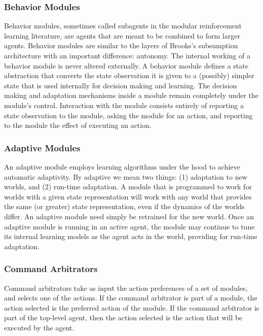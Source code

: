 \subsubsection{Behavior Modules}

Behavior modules, sometimes called subagents in the modular reinforcement learning literature, are agents that are meant to be combined to form larger agents.  Behavior modules are similar to the layers of Brooks's subsumption architecture with an important difference: autonomy.  The internal working of a behavior module is never altered externally.  A behavior module defines a state abstraction that converts the state observation it is given to a (possibly) simpler state that is used internally for decision making and learning.  The decision making and adaptation mechanisms inside a module remain completely under the module's control.  Interaction with the module consists entirely of reporting a state observation to the module, asking the module for an action, and reporting to the module the effect of executing an action.

\subsubsection{Adaptive Modules}

An adaptive module employs learning algorithms under the hood to achieve automatic adaptivity.  By adaptive we mean two things: (1) adaptation to new worlds, and (2) run-time adaptation.  A module that is programmed to work for worlds with a given state representation will work with any world that provides the same (or greater) state representation, even if the dynamics of the worlds differ.  An adaptive module need simply be retrained for the new world.  Once an adaptive module is running in an active agent, the module may continue to tune its internal learning models as the agent acts in the world, providing for run-time adaptation.

\subsubsection{Command Arbitrators}

Command arbitrators take as input the action preferences of a set of modules, and selects one of the actions.  If the command arbitrator is part of a module, the action selected is the preferred action of the module.  If the command arbitrator is part of the top-level agent, then the action selected is the action that will be executed by the agent.

